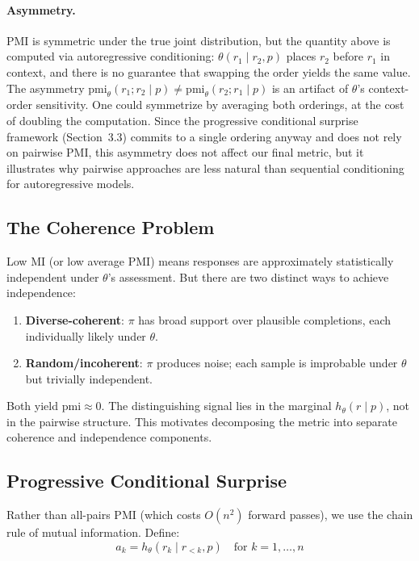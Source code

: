 \documentclass[11pt]{article}
\newcommand{\pmi}{\mathrm{pmi}}
\begin{document}
\paragraph{Asymmetry.} PMI is symmetric under the true joint distribution, but the quantity above is computed via autoregressive conditioning: $\theta(r_1 \mid r_2, p)$ places $r_2$ before $r_1$ in context, and there is no guarantee that swapping the order yields the same value. The asymmetry $\pmi_\theta(r_1; r_2 \mid p) \neq \pmi_\theta(r_2; r_1 \mid p)$ is an artifact of $\theta$'s context-order sensitivity. One could symmetrize by averaging both orderings, at the cost of doubling the computation. Since the progressive conditional surprise framework (Section~3.3) commits to a single ordering anyway and does not rely on pairwise PMI, this asymmetry does not affect our final metric, but it illustrates why pairwise approaches are less natural than sequential conditioning for autoregressive models.

\subsection{The Coherence Problem}\label{sec:coherence-problem}

Low MI (or low average PMI) means responses are approximately statistically independent under $\theta$'s assessment. But there are two distinct ways to achieve independence:
\begin{enumerate}[nosep]
    \item \textbf{Diverse-coherent}: $\pi$ has broad support over plausible completions, each individually likely under $\theta$.
    \item \textbf{Random/incoherent}: $\pi$ produces noise; each sample is improbable under $\theta$ but trivially independent.
\end{enumerate}

Both yield $\pmi \approx 0$. The distinguishing signal lies in the marginal $h_\theta(r \mid p)$, not in the pairwise structure. This motivates decomposing the metric into separate coherence and independence components.

\subsection{Progressive Conditional Surprise}

Rather than all-pairs PMI (which costs $O(n^2)$ forward passes), we use the chain rule of mutual information. Define:
\begin{equation}\label{eq:ak}
    a_k = h_\theta(r_k \mid r_{<k}, p) \quad \text{for } k = 1, \ldots, n
\end{equation}
\end{document}
